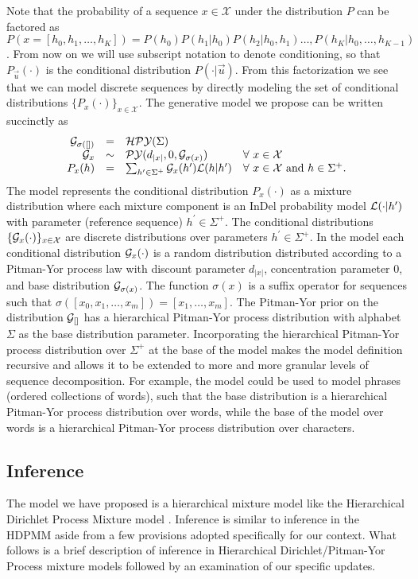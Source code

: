 Note that the probability of a sequence $x \in \mathcal{X}$ under the distribution $P$ can be factored as $P(x = [h_0, h_1, \ldots, h_K]) = P(h_0)P(h_1 | h_0) P(h_2 | h_0, h_1) \ldots, P(h_K | h_0, \ldots, h_{K-1})$.  From now on we will use subscript notation to denote conditioning, so that $P_{\vec u}(\cdot)$ is the conditional distribution $P(\cdot  |  \vec u)$. From this factorization we see that we can model discrete sequences by directly modeling the set of conditional distributions $\{P_x(\cdot)\}_{x \in \mathcal{X}}$.  The generative model we propose can be written succinctly as 
%
\[
\begin{array}{rcll}
\G_{\sigma([])}  &=& \HPY(\Sigma) \\
\G_x &\sim& \PY(d_{|x|},0,\G_{\sigma(x)}) & \forall \ x \in \mathcal{X} \\
P_x(h) &=& \sum_{h^\prime \in \Sigma^+}  \G_x(h^\prime) \likelihood(h | h^\prime) & \forall \ x \in \mathcal{X} \textrm{ and } h \in \Sigma^+.
\end{array}
\]
%
The model represents the conditional distribution $P_x(\cdot)$ as a mixture distribution where each mixture component is an InDel \cite{someone} probability model $\likelihood(\cdot | h^\prime)$ with parameter (reference sequence) $h^\prime \in \Sigma^+$.  The conditional distributions $\{ \G_x(\cdot) \}_{x \in \mathcal{X}}$ are discrete distributions over parameters $h^\prime \in \Sigma^+$.  In the model each conditional distribution $\G_x(\cdot)$ is a random distribution distributed according to a Pitman-Yor process law with discount parameter $d_{|x|}$, concentration parameter 0, and base distribution $\G_{\sigma(x)}$.  The function $\sigma(x)$ is a suffix operator for sequences such that $\sigma([x_0, x_1, \ldots, x_m]) = [x_1, \ldots, x_m]$.  The Pitman-Yor prior on the distribution $\G_{[]}$ has a hierarchical Pitman-Yor process distribution with alphabet $\Sigma$ as the base distribution parameter.  Incorporating the hierarchical Pitman-Yor process distribution over $\Sigma^+$ at the base of the model makes the model definition recursive and allows it to be extended to more and more granular levels of sequence decomposition.  For example, the model could be used to model phrases (ordered collections of words), such that the base distribution is a hierarchical Pitman-Yor process distribution over words, while the base of the model over words is a hierarchical Pitman-Yor process distribution over characters.

\subsection{Inference}
\label{subsection_inference}
The model we have proposed is a hierarchical mixture model like the Hierarchical Dirichlet Process Mixture model \cite{teh}.  Inference is similar to inference in the HDPMM aside from a few provisions adopted specifically for our context.  What follows is a brief description of inference in Hierarchical Dirichlet/Pitman-Yor Process mixture models followed by an examination of our specific updates.

